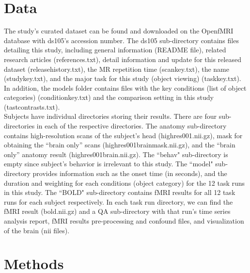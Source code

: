 \documentclass[11pt,twocolumn]{article}
\begin{document}
\section{Data}

The study's curated dataset can be found and downloaded on the OpenfMRI 
database with ds105's accession number. The ds105 
sub-directory contains files detailing this study, including general information 
(README file), related research articles (references.txt), detail information 
and update for this released dataset (release\textunderscore history.txt), 
the MR repetition time (scan\textunderscore key.txt), the name 
(study\textunderscore key.txt), and the major task for this study 
(object viewing) (task\textunderscore key.txt). In addition, the models folder 
contains files with the key conditions (list of object categories) 
(condition\textunderscore key.txt) and the comparison setting in this study 
(tast\textunderscore contrasts.txt). \\

Subjects have individual directories storing their results. There are four 
sub-directories in each of the respective directories. The anatomy 
sub-directory contains high-resolution scans of the subject's head 
(highres001.nii.gz), mask for obtaining the ``brain only'' scans 
(highres001\textunderscore brain\textunderscore mask.nii.gz), and the 
``brain only'' anatomy result (highres001\textunderscore brain.nii.gz). 
The ``behav" sub-directory is empty since subject's behavior is irrelevant 
to this study. The ``model" sub-directory provides information such as the 
onset time (in seconds), and the duration and weighting for each conditions 
(object category) for the 12 task runs in this study. The ``BOLD" sub-directory 
contains fMRI results for all 12 task runs for each subject respectively. 
In each task run directory, we can find the fMRI result (bold.nii.gz) and 
a QA sub-directory with that run's time series analysis report, fMRI results
pre-processing and confound files, and visualization of the brain (nii files).\\ 

\section{Methods}
\end{document}
